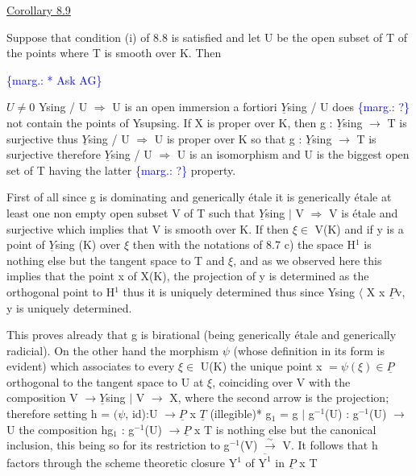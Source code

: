 \documentclass[11pt]{article}
\newcommand{\scanpage}[1]{\par\bigskip\noindent{\small\sffamily[scan #1]}\par}
\newcommand{\mspage}[1]{{\small\sffamily[p.\,#1]}}
\newcommand{\margin}[1]{\textcolor{blue}{\{\textsf{marg.:} #1\}}}
\newcommand{\uline}[1]{\underline{#1}}
\begin{document}
\uline{Corollary 8.9}

Suppose that condition (i) of 8.8 is satisfied and let U be
the open subset of T of the points where T is smooth over K. Then

\margin{* Ask AG}

\clearpage
\scanpage{24/50}
\mspage{50}

$U \neq 0$ Ysing / U $\Rightarrow$ U is an open immersion a fortiori $\underline{Y}$sing / U does \margin{?}
not contain the points of Ysupsing.  If X is proper over K, then
g : $\underline{Y}$sing $\to$ T is surjective thus $\underline{Y}$sing / U $\Rightarrow$ U is proper over K so
that g : $\underline{Y}$sing $\to$ T is surjective therefore $\underline{Y}$sing / U $\Rightarrow$ U is an
isomorphism and U is the biggest open set of T having the latter \margin{?}
property.

First of all since g is dominating and generically étale it
is generically étale at least one non empty open subset V of T
such that $\underline{Y}$sing $|$ V $\Rightarrow$ V is étale and surjective which implies that
V is smooth over K.  If then $\xi \in$ V(K) and if y is a point of $\underline{Y}$sing
(K) over $\xi$ then with the notations of 8.7 c) the space H$^1$ is
nothing else but the tangent space to T and $\xi$, and as we observed
here this implies that the point x of X(K), the projection of y is
determined as the orthogonal point to H$^1$ thus it is uniquely
determined thus since Ysing $\langle$ X x $\underline{P}$v, y is uniquely determined.

This proves already that g is birational (being generically
étale and generically radicial).  On the other hand the morphism $\psi$
(whose definition in its form is evident) which associates to
every $\xi \in$ U(K) the unique point x  $= \psi(\xi) \in \underline{P}$ orthogonal to the
tangent space to U at $\xi$, coinciding over V with the composition V
$\to \underline{Y}$sing $|$ V $\to$ X, where the second arrow is the projection;
therefore setting h = $(\psi$, id):U $\to \underline{P}$ x $\underline{T}$ (illegible)*
g$_1$ = g $|$ g$^{-1}$(U) : g$^{-1}$(U) $\to$ U the composition hg$_1$ : g$^{-1}$(U) $\to \underline{P}$ x T
is nothing else but the canonical inclusion, this being so for its
restriction to g$^{-1}$(V) $\xrightarrow{\sim}$ V.  It follows that h
factors through the scheme theoretic closure Y$^1$ of $\overline{\text{Y}^1}$ in $\underline{P}$ x T
\end{document}
